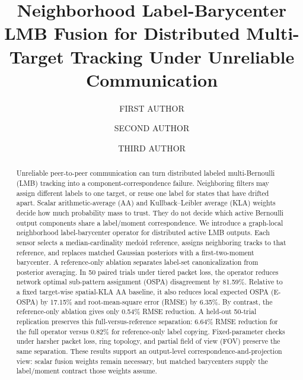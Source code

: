 \documentclass{IEEEtaes}
\newcommand{\method}{neighborhood label-barycenter}
\begin{document}
\title{Neighborhood Label-Barycenter LMB Fusion for Distributed Multi-Target Tracking Under Unreliable Communication}

\author{FIRST AUTHOR}

\author{SECOND AUTHOR}

\author{THIRD AUTHOR}






\maketitle

\begin{abstract}
Unreliable peer-to-peer communication can turn distributed labeled multi-Bernoulli (LMB) tracking into a component-correspondence failure. Neighboring filters may assign different labels to one target, or reuse one label for states that have drifted apart. Scalar arithmetic-average (AA) and Kullback--Leibler average (KLA) weights decide how much probability mass to trust. They do not decide which active Bernoulli output components share a label/moment correspondence. We introduce a graph-local \method{} operator for distributed active LMB outputs. Each sensor selects a median-cardinality medoid reference, assigns neighboring tracks to that reference, and replaces matched Gaussian posteriors with a first-two-moment barycenter. A reference-only ablation separates label-set canonicalization from posterior averaging. In 50 paired trials under tiered packet loss, the operator reduces network optimal sub-pattern assignment (OSPA) disagreement by 81.59\%. Relative to a fixed target-wise spatial-KLA AA baseline, it also reduces local expected OSPA (E-OSPA) by 17.15\% and root-mean-square error (RMSE) by 6.35\%. By contrast, the reference-only ablation gives only 0.54\% RMSE reduction. A held-out 50-trial replication preserves this full-versus-reference separation: 6.64\% RMSE reduction for the full operator versus 0.82\% for reference-only label copying. Fixed-parameter checks under harsher packet loss, ring topology, and partial field of view (FOV) preserve the same separation. These results support an output-level correspondence-and-projection view: scalar fusion weights remain necessary, but matched barycenters supply the label/moment contract those weights assume.
\end{abstract}
\end{document}
